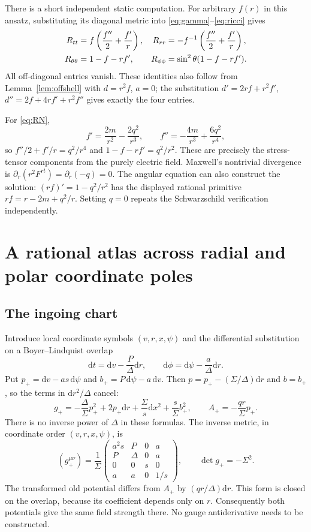 \documentclass[11pt,a4paper]{article}
\numberwithin{equation}{section}
\theoremstyle{definition}\newtheorem{definition}[theorem]{Definition}
\theoremstyle{remark}\newtheorem{remark}[theorem]{Remark}
\newcommand{\dd}{\mathrm{d}}
\begin{document}
There is a short independent static computation. For arbitrary $f(r)$ in this ansatz, substituting its diagonal metric into \eqref{eq:gamma}--\eqref{eq:ricci} gives
\begin{align}
 R_{tt}&=f\left(\frac{f''}{2}+\frac{f'}r\right),&
 R_{rr}&=-f^{-1}\left(\frac{f''}{2}+\frac{f'}r\right),\notag\\
 R_{\theta\theta}&=1-f-rf',&
 R_{\phi\phi}&=\sin^2\theta(1-f-rf').\label{eq:staticRic}
\end{align}
All off-diagonal entries vanish. These identities also follow from Lemma~\ref{lem:offshell} with $d=r^2f$, $a=0$; the substitution $d'=2rf+r^2f'$, $d''=2f+4rf'+r^2f''$ gives exactly the four entries.

For \eqref{eq:RN},
\[
 f'=\frac{2m}{r^2}-\frac{2q^2}{r^3},\qquad
 f''=-\frac{4m}{r^3}+\frac{6q^2}{r^4},
\]
so $f''/2+f'/r=q^2/r^4$ and $1-f-rf'=q^2/r^2$. These are precisely the stress-tensor components from the purely electric field. Maxwell's nontrivial divergence is $\partial_r(r^2F^{rt})=\partial_r(-q)=0$. The angular equation can also construct the solution: $(rf)'=1-q^2/r^2$ has the displayed rational primitive $rf=r-2m+q^2/r$. Setting $q=0$ repeats the Schwarzschild verification independently.

\section{A rational atlas across radial and polar coordinate poles}\label{sec:charts}

\subsection{The ingoing chart}
Introduce local coordinate symbols $(v,r,x,\psi)$ and the differential substitution on a Boyer--Lindquist overlap
\begin{equation}\label{eq:ingoingchange}
 \dd t=\dd v-\frac P\Delta\dd r,\qquad
 \dd\phi=\dd\psi-\frac a\Delta\dd r.
\end{equation}
Put $p_+=\dd v-as\,\dd\psi$ and $b_+=P\,\dd\psi-a\,\dd v$. Then $p=p_+-(\Sigma/\Delta)\dd r$ and $b=b_+$, so the terms in $\dd r^2/\Delta$ cancel:
\begin{equation}\label{eq:ingoing}
 g_+=-\frac\Delta\Sigma p_+^2+2p_+\dd r
          +\frac\Sigma s\dd x^2+\frac s\Sigma b_+^2,
 \qquad A_+=-\frac{qr}{\Sigma}p_+.
\end{equation}
There is no inverse power of $\Delta$ in these formulas. The inverse metric, in coordinate order $(v,r,x,\psi)$, is
\begin{equation}\label{eq:ingoinginv}
 (g_+^{\mu\nu})=\frac1\Sigma
 \begin{pmatrix}
 a^2s&P&0&a\\P&\Delta&0&a\\0&0&s&0\\a&a&0&1/s
 \end{pmatrix},\qquad \det g_+=-\Sigma^2.
\end{equation}
The transformed old potential differs from $A_+$ by $(qr/\Delta)\dd r$. This form is closed on the overlap, because its coefficient depends only on $r$. Consequently both potentials give the same field strength there. No gauge antiderivative needs to be constructed.
\end{document}
